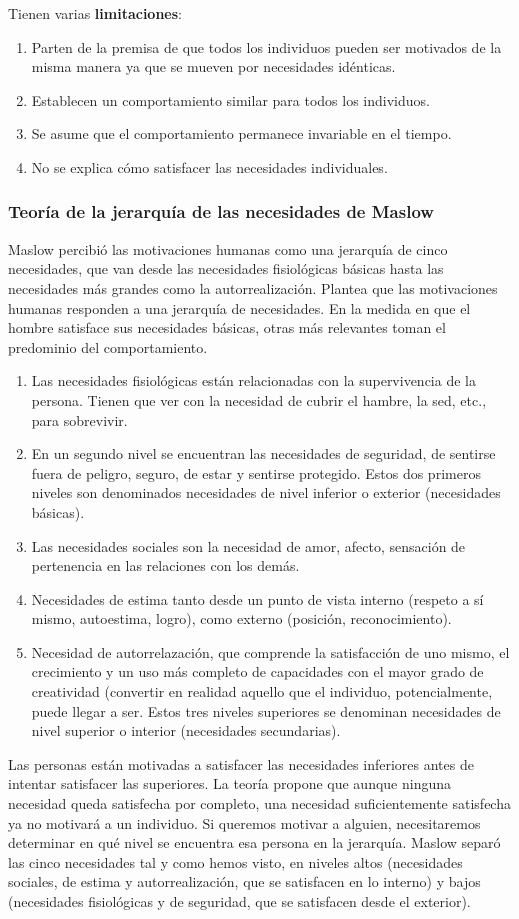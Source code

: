 \documentclass[12pt]{article}
\theoremstyle{definition_wo_parentheses}
\begin{document}
Tienen varias \textbf{limitaciones}:
\begin{enumerate}
\item Parten de la premisa de que todos los individuos pueden ser motivados de la misma manera ya que se mueven por necesidades idénticas.
\item Establecen un comportamiento similar para todos los individuos.
\item Se asume que el comportamiento permanece invariable en el tiempo.
\item No se explica cómo satisfacer las necesidades individuales.
\end{enumerate}

\subsubsection{Teoría de la jerarquía de las necesidades de Maslow}
Maslow percibió las motivaciones humanas como una jerarquía de cinco necesidades, que van desde las necesidades fisiológicas básicas hasta las necesidades más grandes como la autorrealización. Plantea que las motivaciones humanas responden a una jerarquía de necesidades. En la medida en que el hombre satisface sus necesidades básicas, otras más relevantes toman el predominio del comportamiento.
\begin{enumerate}
\item Las necesidades fisiológicas están relacionadas con la supervivencia de la persona. Tienen que ver con la necesidad de cubrir el hambre, la sed, etc., para sobrevivir.
\item En un segundo nivel se encuentran las necesidades de seguridad, de sentirse fuera de peligro, seguro, de estar y sentirse protegido. Estos dos primeros niveles son denominados necesidades de nivel inferior o exterior (necesidades básicas).
\item Las necesidades sociales son la necesidad de amor, afecto, sensación de pertenencia en las relaciones con los demás.
\item Necesidades de estima tanto desde un punto de vista interno (respeto a sí mismo, autoestima, logro), como externo (posición, reconocimiento).
\item Necesidad de autorrelazación, que comprende la satisfacción de uno mismo, el crecimiento y un uso más completo de capacidades con el mayor grado de creatividad (convertir en realidad aquello que el individuo, potencialmente, puede llegar a ser. Estos tres niveles superiores se denominan necesidades de nivel superior o interior (necesidades secundarias).
\end{enumerate}
Las personas están motivadas a satisfacer las necesidades inferiores antes de intentar satisfacer las superiores. La teoría propone que aunque ninguna necesidad queda satisfecha por completo, una necesidad suficientemente satisfecha ya no motivará a un individuo. Si queremos motivar a alguien, necesitaremos determinar en qué nivel se encuentra esa persona en la jerarquía. Maslow separó las cinco necesidades tal y como hemos visto, en niveles altos (necesidades sociales, de estima y autorrealización, que se satisfacen en lo interno) y bajos (necesidades fisiológicas y de seguridad, que se satisfacen desde el exterior).
\end{document}
